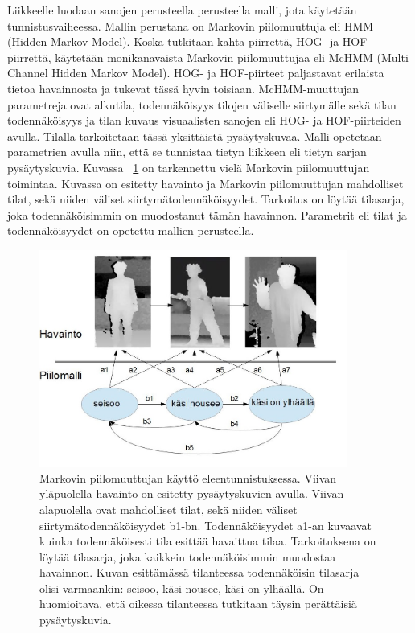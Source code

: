 Liikkeelle luodaan sanojen perusteella perusteella malli, jota käytetään tunnistusvaiheessa. Mallin perustana on Markovin piilomuuttuja
eli HMM (Hidden Markov Model). Koska tutkitaan kahta piirrettä, HOG- ja HOF-piirrettä, käytetään monikanavaista Markovin piilomuuttujaa eli McHMM (Multi Channel Hidden Markov Model). 
HOG- ja HOF-piirteet paljastavat erilaista tietoa havainnosta ja tukevat tässä hyvin toisiaan. McHMM-muuttujan parametreja ovat alkutila, 
todennäköisyys tilojen väliselle siirtymälle sekä tilan todennäköisyys ja tilan kuvaus visuaalisten sanojen eli HOG- ja HOF-piirteiden avulla. 
Tilalla tarkoitetaan tässä yksittäistä pysäytyskuvaa. Malli opetetaan parametrien avulla niin, että se tunnistaa tietyn liikkeen eli tietyn
sarjan pysäytyskuvia.\citep {6239185} Kuvassa ~\ref{fig:HMM} on tarkennettu vielä Markovin piilomuuttujan toimintaa. Kuvassa on 
esitetty havainto ja Markovin piilomuuttujan mahdolliset tilat, sekä niiden väliset siirtymätodennäköisyydet. Tarkoitus on löytää
tilasarja, joka todennäköisimmin on muodostanut tämän havainnon. Parametrit eli tilat ja todennäköisyydet on opetettu mallien perusteella. \\

\begin{figure}[htb]
  \begin{center}
    \includegraphics[width=0.9\textwidth]{HMModfcropped.jpg}
    \caption{Markovin piilomuuttujan käyttö eleentunnistuksessa. Viivan yläpuolella havainto on esitetty pysäytyskuvien avulla. Viivan alapuolella
	ovat mahdolliset tilat,	sekä niiden väliset siirtymätodennäköisyydet b1-bn. Todennäköisyydet a1-an kuvaavat kuinka todennäköisesti tila esittää havaittua tilaa.
	Tarkoituksena on löytää tilasarja, joka kaikkein todennäköisimmin muodostaa havainnon. Kuvan esittämässä tilanteessa todennäköisin tilasarja
	olisi varmaankin: seisoo, käsi nousee, käsi on ylhäällä. On huomioitava, että oikessa tilanteessa tutkitaan täysin perättäisiä pysäytyskuvia.}
    \label{fig:HMM}
  \end{center}
\end{figure}

